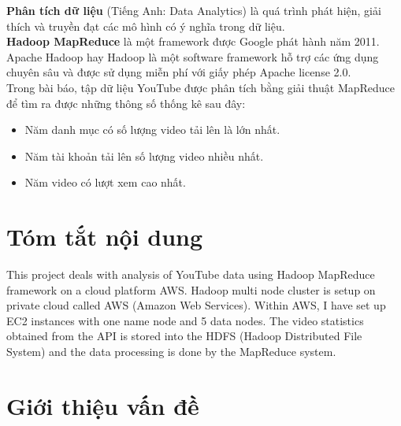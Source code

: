 \documentclass{hcmutarticle}
\begin{document}
\textbf{Phân tích dữ liệu} 
(Tiếng Anh: Data Analytics) là quá trình phát hiện, giải thích và truyền đạt các mô hình có ý nghĩa trong dữ liệu.~\\
\textbf{Hadoop MapReduce} là một framework được Google phát hành năm 2011. Apache Hadoop hay Hadoop là một software framework hỗ trợ các ứng dụng chuyên sâu và được sử dụng miễn phí với giấy phép Apache license 2.0. \\

 Trong bài báo, tập dữ liệu YouTube được phân tích bằng giải thuật MapReduce để tìm ra được những thông số thống kê sau đây:
\begin{itemize}
\item Năm danh mục có số lượng video tải lên là lớn nhất.
\item Năm tài khoản tải lên số lượng video nhiều nhất.
\item Năm video có lượt xem cao nhất.
\end{itemize}

\newpage

\section{Tóm tắt nội dung}\label{survey}
This project deals with analysis of YouTube data using Hadoop MapReduce framework on a cloud platform AWS. Hadoop multi node cluster is setup on private cloud called AWS (Amazon Web Services). Within AWS, I have set up EC2 instances with one name node and 5 data nodes. The video statistics obtained from the API is stored into the HDFS (Hadoop Distributed File System) and the data processing is done by the MapReduce system.


\section{Giới thiệu vấn đề }\label{dev}

\end{document}
